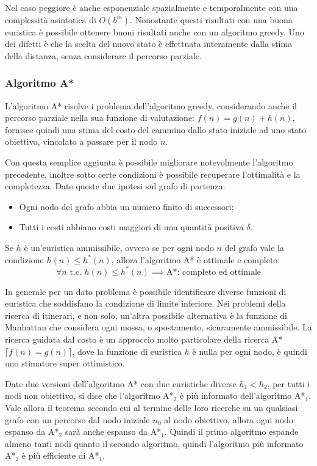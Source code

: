 \documentclass{article}
\numberwithin{equation}{subsection}
\begin{document}
Nel caso peggiore è anche esponenziale spazialmente e temporalmente con una complessità asintotica di $O(b^m)$. Nonostante questi risultati con una buona euristica è 
possibile ottenere buoni risultati anche con un algoritmo greedy. 
Uno dei difetti è che la scelta del nuovo stato è effettuata interamente dalla stima della distanza, senza considerare il percorso parziale. 

\subsubsection{Algoritmo A*}

L'algoritmo A* risolve i problema dell'algoritmo greedy, considerando anche il percorso parziale nella sua funzione di valutazione: $f(n)=g(n)+h(n)$, fornisce 
quindi una stima del costo del cammino dallo stato iniziale ad uno stato obiettivo, vincolato a passare per il nodo $n$. 

Con questa semplice aggiunta è possibile migliorare notevolmente l'algoritmo precedente, inoltre sotto certe condizioni è possibile recuperare l'ottimalità e la 
completezza. Date queste due ipotesi sul grafo di partenza:
\begin{itemize}
    \item Ogni nodo del grafo abbia un numero finito di successori;
    \item Tutti i costi abbiano costi maggiori di una quantità positiva $\delta$. 
\end{itemize}

Se $h$ è un'euristica ammissibile, ovvero se per ogni nodo $n$ del grafo vale la condizione $h(n)\leq h^*(n)$, allora l'algoritmo A* è ottimale e completo:
\begin{equation}
    \forall n\mbox{ t.c. }h(n)\leq h^*(n)\implies \text{A*: completo ed ottimale}
\end{equation}

In generale per un dato problema è possibile identificare diverse funzioni di euristica che soddisfano la condizione di limite inferiore. Nei problemi della ricerca 
di itinerari, e non solo, un'altra possibile alternativa è la funzione di Manhattan che considera ogni mossa, o spostamento, sicuramente ammissibile. La ricerca 
guidata dal costo è un approccio molto particolare della ricerca A* $\lceil f(n)=g(n)\rceil$, dove la funzione di euristica $h$ è nulla per ogni nodo, è quindi uno stimatore 
super ottimistico. 

Date due versioni dell'algoritmo A* con due euristiche diverse $h_1<h_2$, per tutti i nodi non obiettivo, si dice che l'algoritmo A*$_2$ è più informato dell'algoritmo 
A*$_1$. 
Vale allora il teorema secondo cui al termine delle loro ricerche su un qualsiasi grafo con un percorso dal nodo iniziale $n_0$ al nodo obiettivo, allora ogni nodo 
espanso da A*$_2$ sarà anche espanso da A*$_1$. Quindi il primo algoritmo espande almeno tanti nodi quanto il secondo algoritmo, quindi l'algoritmo più informato A*$_2$ 
è più efficiente di A*$_1$. 
\end{document}
